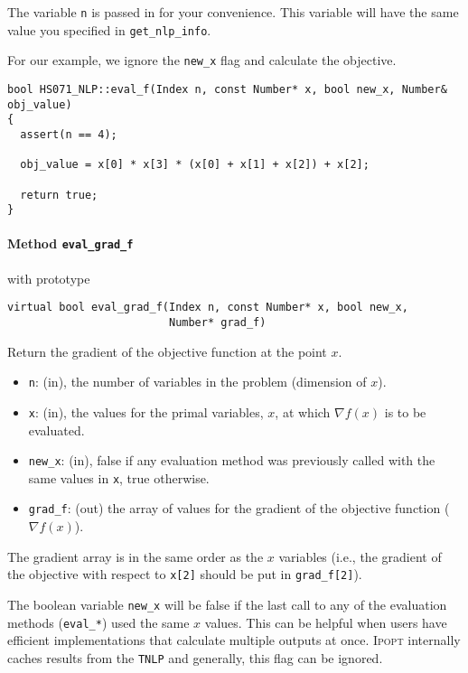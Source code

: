 \documentclass[10pt]{article}
\newcommand{\Ipopt}{\textsc{Ipopt}\xspace}
\begin{document}
The variable {\tt n} is passed in for your convenience. This variable
will have the same value you specified in {\tt get\_nlp\_info}.

For our example, we ignore the {\tt new\_x} flag and calculate the objective.

\begin{footnotesize}
\begin{verbatim}
bool HS071_NLP::eval_f(Index n, const Number* x, bool new_x, Number& obj_value)
{
  assert(n == 4);

  obj_value = x[0] * x[3] * (x[0] + x[1] + x[2]) + x[2];

  return true;
}
\end{verbatim}
\end{footnotesize}

\paragraph{Method {\texttt{eval\_grad\_f}}} with prototype
\begin{verbatim}
virtual bool eval_grad_f(Index n, const Number* x, bool new_x, 
                         Number* grad_f)
\end{verbatim}
Return the gradient of the objective function at the point $x$.
\begin{itemize}
\item {\tt n}: (in), the number of variables in the problem (dimension of $x$). 
\item {\tt x}: (in), the values for the primal variables, $x$, at which
  $\nabla f(x)$ is to be evaluated.
\item {\tt new\_x}: (in), false if any evaluation method was previously called 
        with the same values in {\tt x}, true otherwise.
\item {\tt grad\_f}: (out) the array of values for the gradient of the 
        objective function ($\nabla f(x)$).
\end{itemize}

The gradient array is in the same order as the $x$ variables (i.e., the
gradient of the objective with respect to {\tt x[2]} should be put in
{\tt grad\_f[2]}).

The boolean variable {\tt new\_x} will be false if the last call to
any of the evaluation methods ({\tt eval\_*}) used the same $x$
values. This can be helpful when users have efficient implementations
that calculate multiple outputs at once. \Ipopt internally caches
results from the {\tt TNLP} and generally, this flag can be ignored.
\end{document}
